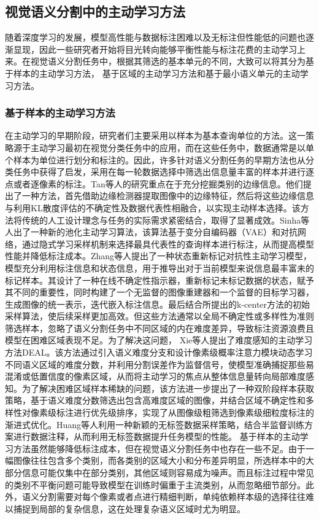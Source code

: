 \subsection{视觉语义分割中的主动学习方法}
随着深度学习的发展，模型高性能与数据标注困难以及无标注但性能低的问题也逐渐显现，因此一些研究者开始将目光转向能够平衡性能与标注花费的主动学习上来。在视觉语义分割任务中，根据其筛选的基本单元的不同，大致可以将其分为基于样本的主动学习方法， 基于区域的主动学习方法和基于最小语义单元的主动学习方法。
\subsubsection{基于样本的主动学习方法}
在主动学习的早期阶段，研究者们主要采用以样本为基本查询单位的方法。这一策略源于主动学习最初在视觉分类任务中的应用，而在这些任务中，数据通常是以单个样本为单位进行划分和标注的。因此，许多针对语义分割任务的早期方法也从分类任务中获得了启发，采用在每一轮数据选择中筛选出信息量丰富的样本并进行逐点或者逐像素的标注。Tan等人的研究重点在于充分挖掘类别的边缘信息。他们提出了一种方法，首先借助边缘检测器提取图像中的边缘特征，然后将这些边缘信息与利用KL散度评估的不确定性及数据代表性相融合，以实现主动样本选择。该方法将传统的人工设计理念与任务的实际需求紧密结合，取得了显著成效。Sinha等人出了一种新的池化主动学习算法，该算法基于变分自编码器（VAE）和对抗网络，通过隐式学习采样机制来选择最具代表性的查询样本进行标注，从而提高模型性能并降低标注成本。Zhang等人提出了一种状态重新标记对抗性主动学习模型，模型充分利用标注信息和状态信息，用于推导出对于当前模型来说信息最丰富未的标记样本。其设计了一种在线不确定性指示器，重新标记未标记数据的状态，赋予其不同的重要性，同时构建了一个无监督的图像重建器和一个监督的目标学习器，生成图像的统一表示，迭代嵌入标注信息。最后结合所提出的k-center方法的初始采样算法，使后续采样更加高效。但这些方法通常以全局不确定性或多样性为准则筛选样本，忽略了语义分割任务中不同区域的内在难度差异，导致标注资源浪费且模型在困难区域表现不足。为了解决这问题， Xie等人提出了难度感知的主动学习方法DEAL。该方法通过引入语义难度分支和设计像素级概率注意力模块动态学习不同语义区域的难度分数，并利用分割误差作为监督信号，使模型准确捕捉那些易混淆或低置信度的像素区域，从而将主动学习的焦点从整体信息量转向局部难度感知。为了解决困难区域样本稀缺的问题，该方法进一步提出了一种双阶段样本获取策略，基于语义难度分数筛选出包含高难度区域的图像，并结合区域不确定性和多样性对像素级标注进行优先级排序，实现了从图像级粗筛选到像素级细粒度标注的渐进式优化。Huang等人利用一种新颖的无标签数据采样策略，结合半监督训练方案进行数据注释，从而利用无标签数据提升任务模型的性能。
基于样本的主动学习方法虽然能够降低标注成本，但在视觉语义分割任务中也存在一些不足。由于一幅图像往往包含多个类别，而各类别的区域大小和分布差异明显，所选样本中的大部分信息可能仅集中在部分类别，其他区域则容易成为噪声。而且标注过程中常见的类别不平衡问题可能导致模型在训练时偏重于主流类别，从而忽略细节部分。此外，语义分割需要对每个像素或者点进行精细判断，单纯依赖样本级的选择往往难以捕捉到局部的复杂信息，这在处理复杂语义区域时尤为明显。
